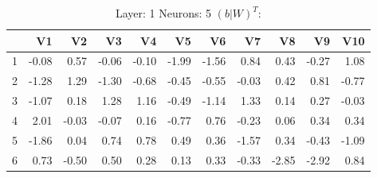 \begin{table}[ht]
\centering
\begin{tabular}{rrrrrrrrrrr}
  \hline
 & V1 & V2 & V3 & V4 & V5 & V6 & V7 & V8 & V9 & V10 \\ 
  \hline
1 & -0.08 & 0.57 & -0.06 & -0.10 & -1.99 & -1.56 & 0.84 & 0.43 & -0.27 & 1.08 \\ 
  2 & -1.28 & 1.29 & -1.30 & -0.68 & -0.45 & -0.55 & -0.03 & 0.42 & 0.81 & -0.77 \\ 
  3 & -1.07 & 0.18 & 1.28 & 1.16 & -0.49 & -1.14 & 1.33 & 0.14 & 0.27 & -0.03 \\ 
  4 & 2.01 & -0.03 & -0.07 & 0.16 & -0.77 & 0.76 & -0.23 & 0.06 & 0.34 & 0.34 \\ 
  5 & -1.86 & 0.04 & 0.74 & 0.78 & 0.49 & 0.36 & -1.57 & 0.34 & -0.43 & -1.09 \\ 
  6 & 0.73 & -0.50 & 0.50 & 0.28 & 0.13 & 0.33 & -0.33 & -2.85 & -2.92 & 0.84 \\ 
   \hline
\end{tabular}
\caption{Layer: 1 Neurons: 5  $(b|W)^T$: 
} 
\end{table}
